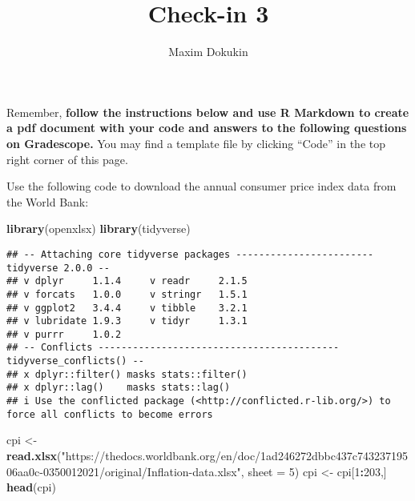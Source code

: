 \documentclass[
]{article}
\title{Check-in 3}
\author{Maxim Dokukin}
\date{}
\newenvironment{Shaded}{\begin{snugshade}}{\end{snugshade}}
\newcommand{\AttributeTok}[1]{\textcolor[rgb]{0.13,0.29,0.53}{#1}}
\newcommand{\DecValTok}[1]{\textcolor[rgb]{0.00,0.00,0.81}{#1}}
\newcommand{\FunctionTok}[1]{\textcolor[rgb]{0.13,0.29,0.53}{\textbf{#1}}}
\newcommand{\NormalTok}[1]{#1}
\newcommand{\OtherTok}[1]{\textcolor[rgb]{0.56,0.35,0.01}{#1}}
\newcommand{\SpecialCharTok}[1]{\textcolor[rgb]{0.81,0.36,0.00}{\textbf{#1}}}
\newcommand{\StringTok}[1]{\textcolor[rgb]{0.31,0.60,0.02}{#1}}
\begin{document}
\maketitle

Remember, \textbf{follow the instructions below and use R Markdown to
create a pdf document with your code and answers to the following
questions on Gradescope.} You may find a template file by clicking
``Code'' in the top right corner of this page.

Use the following code to download the annual consumer price index data
from the World Bank:

\begin{Shaded}
\begin{Highlighting}[]
\FunctionTok{library}\NormalTok{(openxlsx)}
\FunctionTok{library}\NormalTok{(tidyverse)}
\end{Highlighting}
\end{Shaded}

\begin{verbatim}
## -- Attaching core tidyverse packages ------------------------ tidyverse 2.0.0 --
## v dplyr     1.1.4     v readr     2.1.5
## v forcats   1.0.0     v stringr   1.5.1
## v ggplot2   3.4.4     v tibble    3.2.1
## v lubridate 1.9.3     v tidyr     1.3.1
## v purrr     1.0.2     
## -- Conflicts ------------------------------------------ tidyverse_conflicts() --
## x dplyr::filter() masks stats::filter()
## x dplyr::lag()    masks stats::lag()
## i Use the conflicted package (<http://conflicted.r-lib.org/>) to force all conflicts to become errors
\end{verbatim}

\begin{Shaded}
\begin{Highlighting}[]
\NormalTok{cpi }\OtherTok{\textless{}{-}} \FunctionTok{read.xlsx}\NormalTok{(}\StringTok{"https://thedocs.worldbank.org/en/doc/1ad246272dbbc437c74323719506aa0c{-}0350012021/original/Inflation{-}data.xlsx"}\NormalTok{,}
                 \AttributeTok{sheet =} \DecValTok{5}\NormalTok{)}
\NormalTok{cpi }\OtherTok{\textless{}{-}}\NormalTok{ cpi[}\DecValTok{1}\SpecialCharTok{:}\DecValTok{203}\NormalTok{,]}
\FunctionTok{head}\NormalTok{(cpi)}
\end{Highlighting}
\end{Shaded}
\end{document}
